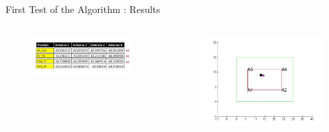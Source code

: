 \documentclass[utf8,compress]{beamer}
\begin{document}
\begin{frame}[containsverbatim]{First Test of the Algorithm : Results}
\begin{columns}
\begin{column}{0.6\textwidth}

    \begin{figure}[h]
        \includegraphics[width=\textwidth]{mesures.png}
    \end{figure}
\end {column}

\begin{column}{0.4\textwidth}

    \begin{figure}[h]
        \includegraphics[width=\textwidth]{pos10.jpg}
    \end{figure}

\end{column}

\end{columns}
\end{frame}
\end{document}
